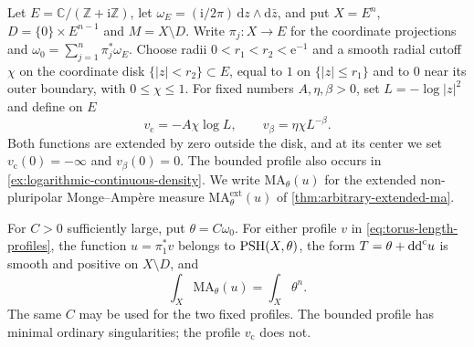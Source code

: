 Let $E=\mathbb C/(\mathbb Z+\mathrm{i}\mathbb Z)$, let $\omega_E=(\mathrm{i}/2\pi)\,\mathrm{d}z\wedge\mathrm{d}\bar z$, and put $X=E^n$, $D=\{0\}\times E^{n-1}$ and $M=X\setminus D$. Write $\pi_j\colon X\to E$ for the coordinate projections and $\omega_0=\sum_{j=1}^n\pi_j^*\omega_E$. Choose radii $0<r_1<r_2<\mathrm{e}^{-1}$ and a smooth radial cutoff $\chi$ on the coordinate disk $\{|z|<r_2\}\subset E$, equal to $1$ on $\{|z|\leq r_1\}$ and to $0$ near its outer boundary, with $0\leq\chi\leq1$. For fixed numbers $A,\eta,\beta>0$, set $L=-\log|z|^2$ and define on $E$
\begin{equation}\label{eq:torus-length-profiles}
 v_{\mathrm c}=-A\chi\log L,\qquad
 v_\beta=\eta\chi L^{-\beta}.
\end{equation}
Both functions are extended by zero outside the disk, and at its center we set $v_{\mathrm c}(0)=-\infty$ and $v_\beta(0)=0$. The bounded profile also occurs in \cref{ex:logarithmic-continuous-density}. We write $\mathrm{MA}_\theta(u)$ for the extended non-pluripolar Monge--Amp\`ere measure $\mathrm{MA}^{\mathrm{ext}}_\theta(u)$ of \cref{thm:arbitrary-extended-ma}.

\begin{lemma}\label{lem:torus-logarithmic-full-mass}
For $C>0$ sufficiently large, put $\theta=C\omega_0$. For either profile $v$ in \eqref{eq:torus-length-profiles}, the function $u=\pi_1^*v$ belongs to $\mathrm{PSH}(X,\theta)$, the form $T=\theta+\mathrm{dd}^{\mathrm{c}} u$ is smooth and positive on $X\setminus D$, and
\[
 \int_X\mathrm{MA}_\theta(u)=\int_X\theta^n.
\]
The same $C$ may be used for the two fixed profiles. The bounded profile has minimal ordinary singularities; the profile $v_{\mathrm c}$ does not.
\end{lemma}

